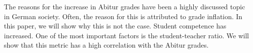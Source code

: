 The reasons for the increase in Abitur grades have been a highly discussed topic in German society. Often, the reason for this is attributed to grade inflation. In this paper, we will show why this is not the case. Student competence has increased. One of the most important factors is the student-teacher ratio. We will show that this metric has a high correlation with the Abitur grades.
